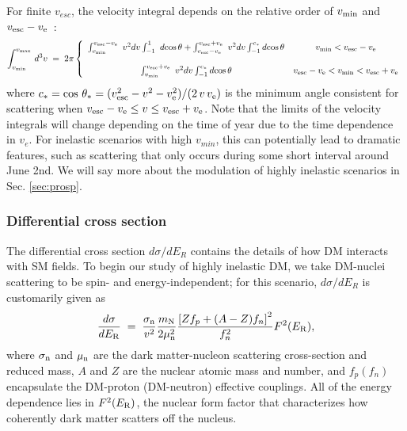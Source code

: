 \documentclass[11pt]{article}
\begin{document}
For finite $v_{esc}$, the velocity integral depends on the relative order of $v_{\rm min}$ and $v_{\rm esc} -v_{\rm e}$~\cite{Lewin:1995rx}:
\begin{equation}
\int_{v_{\rm min}}^{v_{\rm max}} \, d^3 v \; = \; 2 \pi \left\{ \begin{array}{cc} \int_{v_{\rm min}}^{v_{\rm esc} -v_{\rm e}}~v^2 dv  \int_{-1}^{1}~d\!\cos{\theta} +\int_{v_{\rm esc}-v_{\rm e}}^{v_{\rm esc}+ v_{\rm e}}~v^2 dv \int_{-1}^{c_*} d\!\cos{\theta}  & v_{\rm min} < v_{\rm esc}-v_{\rm e} \\
& \\
\int_{v_{\rm min}}^{v_{\rm esc}+ v_{\rm e}}~v^2 dv \int_{-1}^{c_*} d\!\cos{\theta}  & v_{\rm esc}-v_{\rm e} < v_{\rm min} < v_{\rm esc} + v_{\rm e}  \\
\end{array}\right.
\label{eq:fullintegral}
\end{equation}
where $c_* = {\rm cos}~\theta_* = (v_{\rm esc}^2 -v^2-v_{\rm e}^2)/(2\, v\, v_{\rm e})$ is the minimum angle consistent for scattering when $v_{\rm esc}-v_{\rm e}\leq v \leq v_{\rm esc}+v_{\rm e}$. Note that the limits of the velocity integrals will change depending on the time of year due to the time dependence in $v_e$. For inelastic scenarios with high $v_{min}$, this can potentially lead to dramatic features, such as scattering that only occurs during some short interval around June 2nd. We will say more about the modulation of highly inelastic scenarios in Sec. \ref{sec:prosp}.\\

\subsubsection*{Differential cross section}
The differential cross section $d\sigma/dE_R$ contains the details of how DM interacts with SM fields. To begin our study of highly inelastic DM, we take DM-nuclei scattering to be spin- and energy-independent; for this scenario, $d\sigma/dE_R$ is customarily given as
\begin{equation}
\frac{d\sigma}{d E_{\rm R}} \; = \; \frac{\sigma_{\rm n}}{v^2}\frac{m_{\rm N}}{2 \mu_{\rm n}^2} \frac{\left[Z f_p +(A-Z)f_n \right]^2}{f_n^2} F^2(E_{\rm R}),
\label{eq:dsnde}
\end{equation}
where $\sigma_{\rm n}$ and $\mu_{\rm n}$ are the dark matter-nucleon scattering cross-section and reduced mass, $A$ and $Z$ are the nuclear atomic mass and number, and $f_p(f_n)$ encapsulate the DM-proton (DM-neutron) effective couplings. All of the energy dependence lies in $F^2(E_{\rm R})$, the nuclear form factor that characterizes how coherently dark matter scatters off the nucleus.
\end{document}

